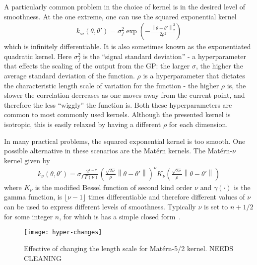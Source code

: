 A particularly common problem in the choice of kernel is in the desired level
of smoothness.  At the one extreme, one can use the squared exponential kernel
\begin{align}
\label{eq:opt:se-kernel}
k_{\mathrm{se}} \left(\theta,\theta'\right) = \sigma_f^2 \exp \left(-\frac{\left\lVert \theta - \theta'\right\rVert^2_2}{2 \rho^2}\right)
\end{align}
which is infinitely differentiable.  It is also sometimes known as
the exponentiated quadratic kernel. Here $\sigma_f^2$ is the ``signal 
standard deviation'' - a hyperparameter that
effects the scaling of the output from the GP: the larger $\sigma$, the higher
the average standard deviation of the function.  $\rho$ is a hyperparameter
that dictates the characteristic length scale of variation for the function - the
higher $\rho$ is, the slower the correlation decreases as one moves away from the
current point, and therefore the less ``wiggly'' the function is.  Both these
hyperparameters are common to most commonly used kernels.  Although the
presented kernel is isotropic, this is easily relaxed by having a different $\rho$
for each dimension.

In many practical problems, the squared exponential kernel is too smooth.
One possible alternative in these scenarios are the Mat\'{e}rn kernels.  The
Mat\'{e}rn-$\nu$ kernel given by
\begin{align}
k_{\nu}\left(\theta,\theta'\right) = \sigma_f \frac{2^{1-\nu}}{\Gamma\left(\nu\right)}\left(\frac{\sqrt{2\nu}}{\rho}\left\lVert\theta-\theta'\right\rVert\right)^{\nu} K_\nu
 \left(\frac{\sqrt{2\nu}}{\rho}\left\lVert\theta-\theta'\right\rVert\right)
\end{align}
where $K_{\nu}$ is the modified Bessel function of second kind order $\nu$
and $\gamma(\cdot)$ is the gamma function,
is $\lfloor\nu-1\rfloor$ times differentiable and
therefore different values of $\nu$ can be used to express different levels
of smoothness.  Typically $\nu$ is set to $n+1/2$ for some integer $n$, for
which is has a simple closed form~\cite{rasmussen2006gaussian}.

\begin{figure}[t]
	\centering
	\texttt{[image: hyper-changes]}
	\caption{Effective of changing the length scale for Mat\'{e}rn-5/2 kernel. NEEDS CLEANING \label{fig:opt:hyper-changes}}
\end{figure}

